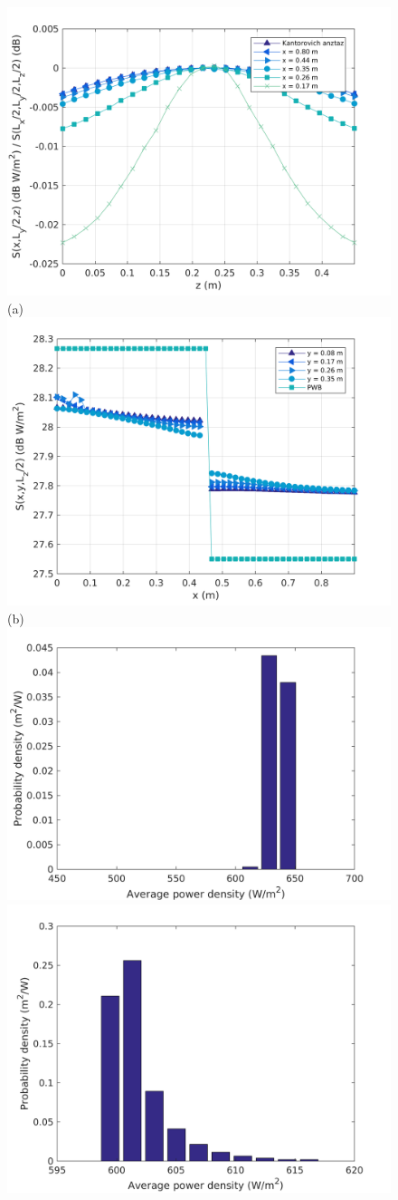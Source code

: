 \documentclass[a4paper]{article}
\numberwithin{equation}{section}
\begin{document}
\begin{figure}[hp]
\begin{center}
\includegraphics[width=0.6\linewidth]{figures/SDM_3D_DU_PowerDensityProfileZ}\\
{\footnotesize (a)}\\
\vspace{2mm}
\includegraphics[width=0.6\linewidth]{figures/SDM_3D_DU_PowerDensityProfileX}\\
{\footnotesize (b)}\\
\vspace{2mm}
\includegraphics[width=0.45\linewidth]{figures/SDM_3D_DU_PowerDensityPDF1}
\includegraphics[width=0.45\linewidth]{figures/SDM_3D_DU_PowerDensityPDF2}

\end{center}
\end{figure}
\end{document}
